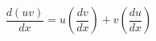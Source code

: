 \documentclass[12pt]{article}
\begin{document}
\sicpsize
\[
\frac{d(uv)}{dx} = u \left(\frac{dv}{dx}\right) + v \left(\frac{du}{dx}\right)
\]
\end{document}

